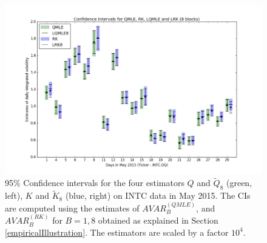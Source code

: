 \documentclass[11pt]{article}
\numberwithin{equation}{section}
\theoremstyle{plain}
\theoremstyle{remark}
\begin{document}
\begin{figure}
\includegraphics[width=1\linewidth]{CIMayRKQMLELog.png}
\centering
\caption{95\% Confidence intervals for the four estimators $Q$ and $\tilde{Q}_8$ (green, left), $K$ and $\tilde{K}_8$ (blue, right) on INTC data in May 2015. The CIs are computed using the estimates of $AVAR_{B}^{(QMLE)}$, and $AVAR_{B}^{(RK)}$ for $B =1,8$ obtained as explained in Section \ref{empiricalIllustration}. The estimators are scaled by a factor $10^4$. }
\label{CI}
\end{figure}
\end{document}
